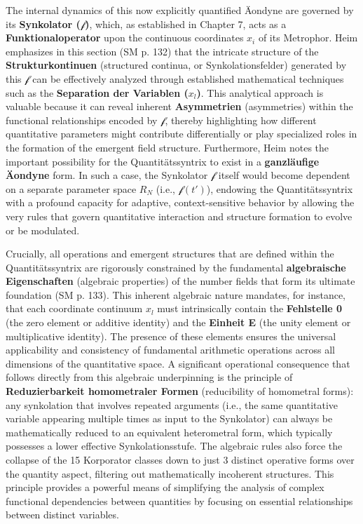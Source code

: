 \documentclass[12pt]{article}
\newcommand{\funktionaloperator}{\mathcal{f}}
\begin{document}
The internal dynamics of this now explicitly quantified Äondyne are governed by its \textbf{Synkolator (\( \funktionaloperator \))}, which, as established in Chapter 7, acts as a \textbf{Funktionaloperator} upon the continuous coordinates \( x_i \) of its Metrophor. Heim emphasizes in this section (SM p. 132) that the intricate structure of the \textbf{Strukturkontinuen} (structured continua, or Synkolationsfelder) generated by this \( \funktionaloperator \) can be effectively analyzed through established mathematical techniques such as the \textbf{Separation der Variablen (\( x_l \))}. This analytical approach is valuable because it can reveal inherent \textbf{Asymmetrien} (asymmetries) within the functional relationships encoded by \( \funktionaloperator \), thereby highlighting how different quantitative parameters might contribute differentially or play specialized roles in the formation of the emergent field structure. Furthermore, Heim notes the important possibility for the Quantitätssyntrix to exist in a \textbf{ganzläufige \"{A}ondyne} form. In such a case, the Synkolator \( \funktionaloperator \) itself would become dependent on a separate parameter space \( R_N \) (i.e., \( \funktionaloperator(t') \)), endowing the Quantitätssyntrix with a profound capacity for adaptive, context-sensitive behavior by allowing the very rules that govern quantitative interaction and structure formation to evolve or be modulated.

Crucially, all operations and emergent structures that are defined within the Quantitätssyntrix are rigorously constrained by the fundamental \textbf{algebraische Eigenschaften} (algebraic properties) of the number fields that form its ultimate foundation (SM p. 133). This inherent algebraic nature mandates, for instance, that each coordinate continuum \( x_l \) must intrinsically contain the \textbf{Fehlstelle 0} (the zero element or additive identity) and the \textbf{Einheit E} (the unity element or multiplicative identity). The presence of these elements ensures the universal applicability and consistency of fundamental arithmetic operations across all dimensions of the quantitative space. A significant operational consequence that follows directly from this algebraic underpinning is the principle of \textbf{Reduzierbarkeit homometraler Formen} (reducibility of homometral forms): any synkolation that involves repeated arguments (i.e., the same quantitative variable appearing multiple times as input to the Synkolator) can always be mathematically reduced to an equivalent heterometral form, which typically possesses a lower effective Synkolationsstufe. The algebraic rules also force the collapse of the 15 Korporator classes down to just 3 distinct operative forms over the quantity aspect, filtering out mathematically incoherent structures. This principle provides a powerful means of simplifying the analysis of complex functional dependencies between quantities by focusing on essential relationships between distinct variables.
\end{document}
